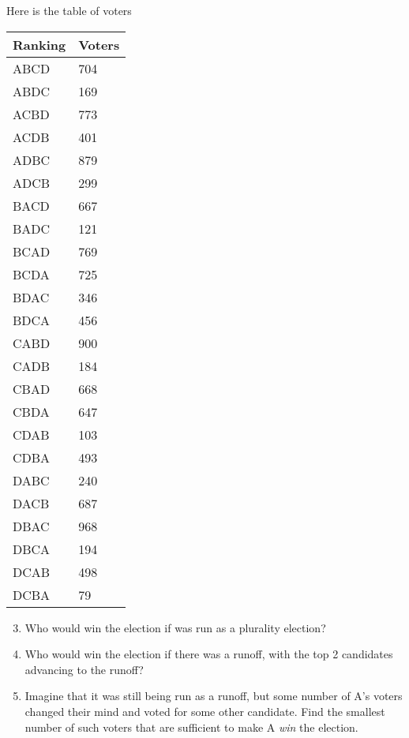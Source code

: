Here is the table of voters

\begin{table}[htbp]
\begin{minipage}{\linewidth}
\setlength{\tymax}{0.5\linewidth}
\centering
\small
\begin{tabulary}{\textwidth}{@{}ll@{}} \toprule
	Ranking	&	Voters	\\
\midrule

	ABCD	&	704	\\
	ABDC	&	169	\\
	ACBD	&	773	\\
	ACDB	&	401	\\
	ADBC	&	879	\\
	ADCB	&	299	\\
	BACD	&	667	\\
	BADC	&	121	\\
	BCAD	&	769	\\
	BCDA	&	725	\\
	BDAC	&	346	\\
	BDCA	&	456	\\
	CABD	&	900	\\
	CADB	&	184	\\
	CBAD	&	668	\\
	CBDA	&	647	\\
	CDAB	&	103	\\
	CDBA	&	493	\\
	DABC	&	240	\\
	DACB	&	687	\\
	DBAC	&	968	\\
	DBCA	&	194	\\
	DCAB	&	498	\\
	DCBA	&	79	\\
\bottomrule

\end{tabulary}
\end{minipage}
\end{table}

\begin{enumerate}
\setcounter{enumi}{2}
\item{} Who would win the election if was run as a plurality election?

\item{} Who would win the election if there was a runoff, with the top 2 candidates advancing to the runoff?

\item{} Imagine that it was still being run as a runoff, but some number of A's voters changed their mind and voted for some other candidate. Find the smallest number of such voters that are sufficient to make A \emph{win} the election.

\end{enumerate}

